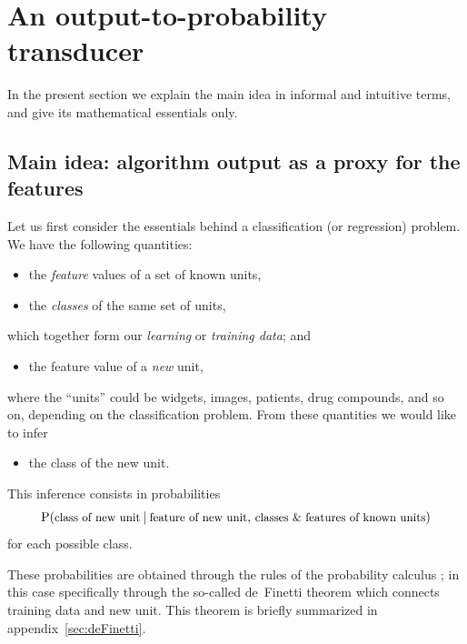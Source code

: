 \documentclass[\ifafour a4paper,12pt,\else a5paper,10pt,\fi%
onecolumn,oneside,article,%
british%
]{memoir}
\theoremstyle{remark}
\theoremstyle{innote}
\newcommand*{\amp}{\&}
\newcommand*{\pencil}{{\fontencoding{U}\fontfamily{fontawesometwo}\selectfont\symbol{210}}}
\newcommand{\mynotep}[1]{{\footnotesize\color{notecolour}\pencil\ #1}}
\renewcommand*{\P}{\mathrm{P}}%
\renewcommand*{\|}[1][]{\nonscript\:#1\vert\nonscript\:\mathopen{}}
\newcommand*{\chap}{ch.}%
\newcommand*{\chaps}{chs}%
\newcommand*{\texts}[1]{\text{\small #1}}
\begin{document}
\section{An output-to-probability transducer}
\label{sec:transducer}

In the present section we explain the main idea in informal and intuitive terms, and give its  mathematical essentials only. %



\subsection{Main idea: algorithm output as a proxy for the features}
\label{sec:essential_idea}

Let us first consider the essentials behind a classification (or regression) problem. We have the following quantities:
\begin{itemize}
\item the \emph{feature} values of a set of known units,
\item the \emph{classes} of the same set of units,
\end{itemize}
which together form our \emph{learning} or \emph{training data}; and
\begin{itemize}[resume]
\item the feature value of a \emph{new} unit,
\end{itemize}
where the \enquote{units} could be widgets, images, patients, drug compounds, and so on, depending on the classification problem. From these quantities we would like to infer
\begin{itemize}[resume]
\item  the class of the new unit.
\end{itemize}
This inference consists in probabilities
\begin{equation}
  \label{eq:prob_essential}
  \P(\texts{class of new unit} \| \texts{feature of new unit},\,
  \texts{classes \amp\ features of known units})
\end{equation}
for each possible class.

These probabilities are obtained through the rules of the probability calculus \autocites{jaynes1994_r2003}[\chaps~12--13]{russelletal1995_r2022}[\addcolon see further references in appendix~\ref{sec:maths_transducer}]{gregory2005,hailperin2011,jeffreys1939_r1983}; in this case specifically through the so-called de~Finetti theorem \autocites[\chap~4]{bernardoetal1994_r2000}{dawid2013} which connects training data and new unit. This theorem is briefly summarized in appendix~\ref{sec:deFinetti}.
\end{document}
